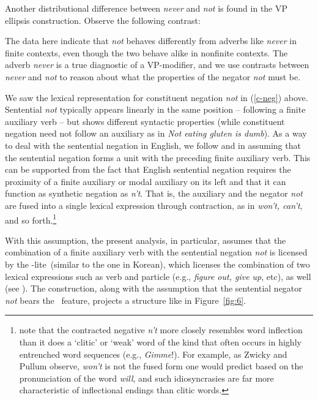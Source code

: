 \documentclass[output=paper]{langsci/langscibook}
\begin{document}
{\begin{exe}
\begin{xlist}
\begin{exe}
\begin{xlist}
Another distributional difference between \emph{never} and \emph{not} is found in
the VP ellipsis construction.  Observe the following
contrast:

\eal
\label{vpe-not-ex}
\zl


%
The data here indicate that \emph{not} behaves differently from
adverbs like \emph{never} in finite contexts, even though the two
behave alike in nonfinite contexts. The adverb \emph{never} is a true
diagnostic of a VP-modifier, and we use contrasts between \emph{never} and \emph{not} to reason about what the properties of
the negator \emph{not} must be.


We saw the lexical representation for constituent negation
\emph{not} in (\ref{c-neg}) above.
 Sentential \emph{not} typically appears linearly in the
same position -- following a finite auxiliary verb -- but shows
different syntactic properties (while
 constituent negation need not follow an auxiliary
 as in \emph{Not eating gluten is dumb}).
 As a way
 to deal with the sentential negation in English,
  we follow \citet{Bresnan:01} and \citet{KM} in assuming that the sentential negation forms a unit with the preceding
finite auxiliary verb.  This can be supported from
the fact that English sentential negation requires the proximity of
a finite auxiliary or modal auxiliary on its left and that it can function as synthetic negation as \emph{n't}. That is, the auxiliary and the negator \emph{not} are fused into a single lexical
expression through contraction, as in \emph{won't, can't},
and so forth.\footnote{\citet{ZP:83} note that the contracted
negative \emph{n't} more closely
resembles word inflection than it does a `clitic' or `weak' word of
the kind that often occurs in highly entrenched word sequences
(e.g., \emph{Gimme}!). For example, as Zwicky and Pullum observe,
\emph{won't} is not the fused form one would predict based on
the pronunciation of the word \emph{will}, and such idiosyncrasies are far more characteristic of inflectional endings than clitic words.}



 With this assumption, the
present analysis, in particular, assumes that the combination of a finite auxiliary verb with the sentential
negation \emph{not} is licensed by the \hd-lite\ (similar to the one in Korean), which licenses
the combination of two lexical expressions such as verb and particle (e.g., \emph{figure out, give
  up}, etc), as well (see \citet{KM}). The construction, along with the assumption that the
sentential negator \emph{not} bears the \LEX\ feature, projects a structure like in Figure~\ref{fig:6}.


\end{xlist}
\end{exe}
\end{xlist}
\end{exe}}
\end{document}
